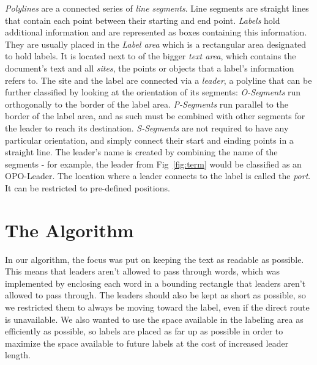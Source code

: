 \documentclass[11pt,a4paper]{vutinfth}
\begin{document}
\emph{Polylines} are a connected series of \emph{line segments}. Line segments are straight lines that contain each point between their starting and end point. 
\emph{Labels} hold additional information and are represented as boxes containing this information. They are usually placed in the \emph{Label area} which is a rectangular area designated to hold labels. It is located next to of the bigger \emph{text area}, which contains the document's text and all \emph{sites}, the points or objects that a label's information refers to. The site and the label are connected via a \emph{leader}, a polyline that can be further classified by looking at the orientation of its segments: \emph{O-Segments} run orthogonally to the border of the label area. \emph{P-Segments} run parallel to the border of the label area, and as such must be combined with other segments for the leader to reach its destination. \emph{S-Segments} are not required to have any particular orientation, and simply connect their start and einding points in a straight line.
The leader's name is created by combining the name of the segments - for example, the leader from Fig~\ref{fig:term} would be classified as an OPO-Leader.%
The location where a leader connects to the label is called the \emph{port}. It can be restricted to pre-defined positions. %


\chapter{The Algorithm}

In our algorithm, the focus was put on keeping the text as readable as possible. This means that leaders aren't allowed to pass through words, which was implemented by enclosing each word in a bounding rectangle that leaders aren't allowed to pass through.
The leaders should also be kept as short as possible, so we restricted them to always be moving toward the label, even if the direct route is unavailable.%
We also wanted to use the space available in the labeling area as efficiently as possible, so labels are placed as far up as possible in order to maximize the space available to future labels at the cost of increased leader length.
\end{document}
